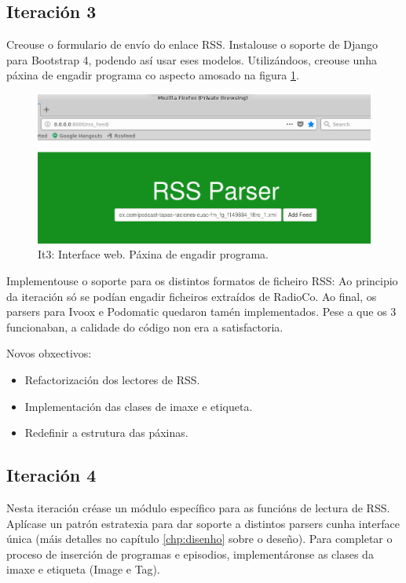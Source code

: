 \subsection{Iteración 3}

Creouse o formulario de envío do enlace RSS. Instalouse o soporte de Django para Bootstrap 4, podendo así usar eses modelos. Utilizándoos, creouse unha páxina de engadir programa co aspecto amosado na figura \ref{fig:it3_add_program}.

\begin{figure}[h]
	\centering
	\includegraphics[scale=0.5,keepaspectratio=true]{./images/it3_add_program.png}
	\caption{It3: Interface web. Páxina de engadir programa.}
	\label{fig:it3_add_program}
\end{figure}

Implementouse o soporte para os distintos formatos de ficheiro RSS: Ao principio da iteración só se podían engadir ficheiros extraídos de RadioCo. Ao final, os parsers para Ivoox e Podomatic quedaron tamén implementados. Pese a que os 3 funcionaban, a calidade do código non era a satisfactoria.

Novos obxectivos:

\begin{itemize}
	\item Refactorización dos lectores de RSS.
	\item Implementación das clases de imaxe e etiqueta.
	\item Redefinir a estrutura das páxinas. 
\end{itemize}


\subsection{Iteración 4}

Nesta iteración créase un módulo específico para as funcións de lectura de RSS. Aplícase un patrón estratexia para dar soporte a distintos parsers cunha interface única (máis detalles no capítulo \ref{chp:disenho} sobre o deseño). Para completar o proceso de inserción de programas e episodios, implementáronse as clases da imaxe e etiqueta (Image e Tag).

